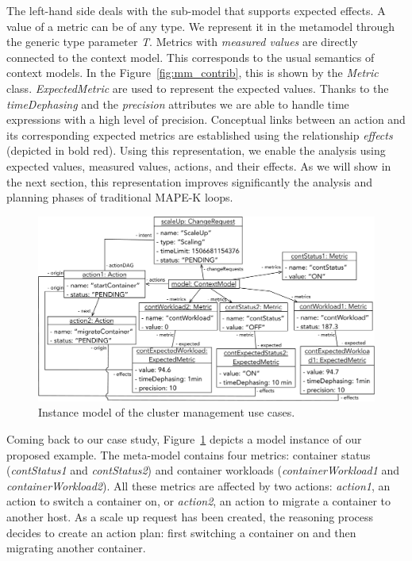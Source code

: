 The left-hand side deals with the sub-model that supports expected effects.
A value of a metric can be of any type. 
We represent it in the metamodel through the generic type parameter \textit{T}.
Metrics with \textit{measured values} are directly connected to the context model.
This corresponds to the usual semantics of context models.
In the Figure~\ref{fig:mm_contrib}, this is shown by the \textit{Metric} class.
\textit{ExpectedMetric} are used to represent the expected values.
Thanks to the \textit{timeDephasing} and the \textit{precision} attributes we are able to handle time expressions with a high level of precision.
Conceptual links between an action and its corresponding expected metrics are established using the relationship \textit{effects} (depicted in bold red). 
Using this representation, we enable the analysis using expected values, measured values, actions, and their effects. 
As we will show in the next section, this representation improves significantly the analysis and planning phases of traditional MAPE-K loops. 

\begin{figure}
	\centering
	\includegraphics[width=0.7\linewidth]{img/chapt-tkm/actionAsContextElement/example2}
	\caption{Instance model of the cluster management use cases.}
	\label{fig:example-complete}
\end{figure}

Coming back to our case study, Figure~\ref{fig:example-complete} depicts a model instance of our proposed example.
The meta-model contains four metrics: container status (\textit{contStatus1} and \textit{contStatus2}) and container workloads (\textit{containerWorkload1} and \textit{containerWorkload2}).
All these metrics are affected by two actions: \textit{action1}, an action to switch a container on, or \textit{action2}, an action to migrate a container to another host.
As a scale up request has been created, the reasoning process decides to create an action plan: first switching a container on and then migrating another container.

